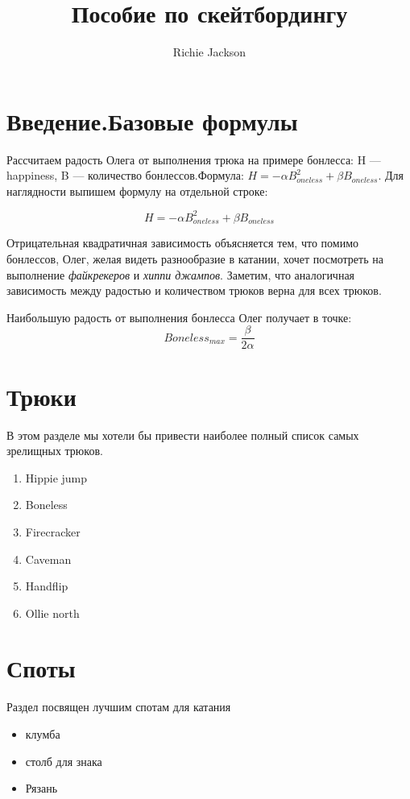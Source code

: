 \documentclass[12pt]{article} %
\title{Пособие по скейтбордингу}
\author{Richie Jackson}
\begin{document}
\maketitle %

\section{Введение.Базовые формулы} %

\par %

Рассчитаем радость Олега от выполнения трюка на примере бонлесса: H --- happiness, B --- количество бонлессов.Формула: $H = -\alpha B_{oneless}^{2} + \beta B_{oneless}$. Для наглядности выпишем формулу на отдельной строке:


\[
H = -\alpha B_{oneless}^{2} + \beta B_{oneless}
\]

Отрицательная квадратичная зависимость объясняется тем, что помимо бонлессов, Олег, желая видеть разнообразие в катании, хочет посмотреть на выполнение \textit{файкрекеров} и \textit{хиппи джампов}. Заметим, что аналогичная зависимость между радостью и количеством трюков верна для всех трюков. 

\par

Наибольшую радость от выполнения бонлесса Олег получает в точке:
\[
Boneless_{max} = \frac{\beta}{2\alpha}
\]

\section{Трюки}

В этом разделе мы хотели бы привести наиболее полный список самых зрелищных трюков. 

\begin{enumerate} %

\item Hippie jump
\item Boneless
\item Firecracker
\item Caveman
\item Handflip
\item Ollie north
	
\end{enumerate}

\section{Споты}

Раздел посвящен лучшим спотам для катания

\begin{itemize}
\item клумба
\item столб для знака
\item Рязань
\end{itemize}
\end{document}
